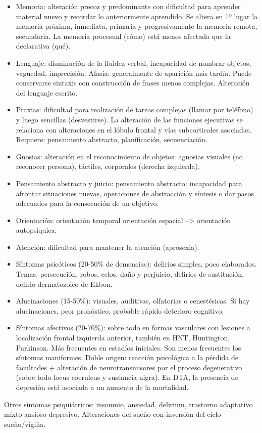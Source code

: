 \begin{itemize}
	\item Memoria: alteración precoz y predominante con dificultad para aprender material nuevo y recordar lo anteriormente aprendido. Se altera en 1º lugar la memoria próxima, inmediata, primaria y progresivamente la memoria remota, secundaria. La memoria procesual (cómo) está menos afectada que la declarativa (qué).
	\item Lenguaje: disminución de la fluidez verbal, incapacidad de nombrar objetos, vaguedad, imprecisión. Afasia: generalmente de aparición más tardía. Puede conservarse sintaxis con construcción de frases menos complejas. Alteración del lenguaje escrito.
	\item Praxias: dificultad para realización de tareas complejas (llamar por teléfono) y luego sencillas (desvestirse). La alteración de las funciones ejecutivas se relaciona con alteraciones en el lóbulo frontal y vías subcorticales asociadas. Requiere: pensamiento abstracto, planificación, secuenciación.
	\item Gnosias: alteración en el reconocimiento de objetos: agnosias visuales (no reconocer persona), táctiles, corporales (derecha izquierda).
	\item Pensamiento abstracto y juicio: pensamiento abstracto: incapacidad para afrontar situaciones nuevas, operaciones de abstracción y síntesis o dar pasos adecuados para la consecución de un objetivo.
	\item Orientación: orientación temporal orientación espacial –> orientación autopsíquica.
	\item Atención: dificultad para mantener la atención (aprosexia).
	\item Síntomas psicóticos (20-50\% de demencias): delirios simples, poco elaborados. Temas: persecución, robos, celos, daño y perjuicio, delirios de sustitución, delirio dermatozoico de Ekbon.
	\item Alucinaciones (15-50\%): visuales, auditivas, olfatorias o cenestésicas. Si hay alucinaciones, peor pronóstico, probable rápido deterioro cognitivo.
	\item Síntomas afectivos (20-70\%): sobre todo en formas vasculares con lesiones a localización frontal izquierda anterior, también en HNT, Huntington, Parkinson. Más frecuentes en estadíos iniciales. Son menos frecuentes los síntomas maniformes. Doble origen: reacción psicológica a la pérdida de facultades + alteración de neurotransmisores por el proceso degenerativo (sobre todo locus coeruleus y sustancia nigra). En DTA, la presencia de depresión está asociada a un aumento de la mortalidad.
\end{itemize}
Otros síntomas psiquiátricos: insomnio, ansiedad, delirium, trastorno adaptativo mixto ansioso-depresivo. Alteraciones del sueño con inversión del ciclo sueño/vigilia.

